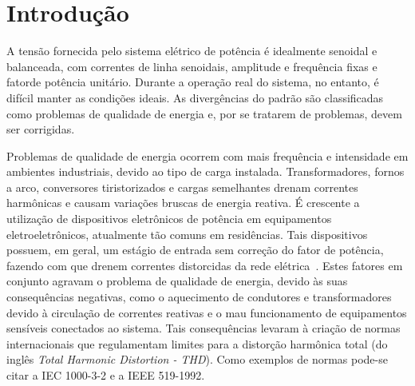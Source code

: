 
\chapter{Introdução}\label{introducao}


	A tensão fornecida pelo sistema elétrico de potência é idealmente senoidal e balanceada, com correntes de linha senoidais, amplitude e frequência fixas e fatorde potência unitário. Durante a operação real do sistema, no entanto, é difícil manter as condições ideais. As divergências do padrão são classificadas como problemas de qualidade de energia e, por se tratarem de problemas, devem ser corrigidas.

	Problemas de qualidade de energia ocorrem com mais frequência e intensidade em ambientes industriais, devido ao tipo de carga instalada. Transformadores, fornos a arco, conversores tiristorizados e cargas semelhantes drenam correntes harmônicas e causam variações bruscas de energia reativa. É crescente a utilização de dispositivos eletrônicos de potência em equipamentos eletroeletrônicos, atualmente tão comuns em residências. Tais dispositivos possuem, em geral, um estágio de entrada sem correção do fator de potência, fazendo com que drenem correntes distorcidas da rede elétrica~\cite{ref:MANSOOR}. Estes fatores em conjunto agravam o problema de qualidade de energia, devido às suas consequências negativas, como	o aquecimento de condutores e transformadores devido à circulação de correntes reativas e o mau funcionamento de equipamentos sensíveis conectados ao sistema.	Tais consequências levaram à criação de normas internacionais que regulamentam limites para a distorção harmônica total (do inglês \emph{Total Harmonic Distortion - THD}). Como exemplos de normas pode-se citar a IEC 1000-3-2 e a IEEE 519-1992.

